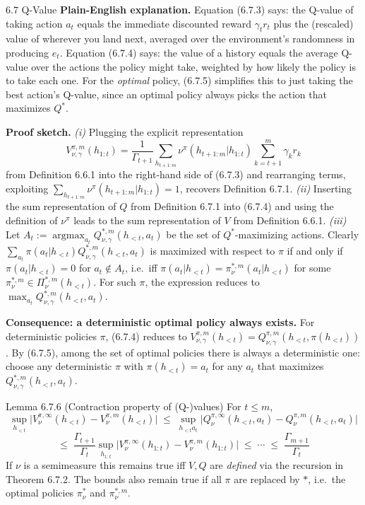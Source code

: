\documentclass[aspectratio=169,10pt]{beamer}
\begin{document}
\begin{frame}[allowframebreaks]{6.7 Q-Value}
\textbf{Plain-English explanation.} Equation (6.7.3) says: the Q-value of
taking action $a_t$ equals the immediate discounted reward $\gamma_t r_t$
plus the (rescaled) value of wherever you land next, averaged over the
environment's randomness in producing $e_t$. Equation (6.7.4) says: the
value of a history equals the average Q-value over the actions the policy
might take, weighted by how likely the policy is to take each one. For the
\emph{optimal} policy, (6.7.5) simplifies this to just taking the best
action's Q-value, since an optimal policy always picks the action that
maximizes $Q^{*}$.

\framebreak

\textbf{Proof sketch.} \emph{(i)} Plugging the explicit representation
\[
  V^{\pi,m}_{\nu,\gamma}(h_{1:t}) = \frac{1}{\Gamma_{t+1}}\sum_{h_{t+1:m}}\nu^\pi(h_{t+1:m}|h_{1:t})\sum_{k=t+1}^m\gamma_k r_k
\]
from Definition 6.6.1 into the right-hand side of (6.7.3) and rearranging
terms, exploiting $\sum_{h_{t+1:m}}\nu^\pi(h_{t+1:m}|h_{1:t})=1$, recovers
Definition 6.7.1. \emph{(ii)} Inserting the sum representation of $Q$ from
Definition 6.7.1 into (6.7.4) and using the definition of $\nu^\pi$ leads to
the sum representation of $V$ from Definition 6.6.1. \emph{(iii)} Let
$A_t := \operatorname{argmax}_{a_t}Q^{*,m}_{\nu,\gamma}(h_{<t},a_t)$ be the
set of $Q^{*}$-maximizing actions. Clearly
$\sum_{a_t}\pi(a_t|h_{<t})Q^{*,m}_{\nu,\gamma}(h_{<t},a_t)$ is maximized
with respect to $\pi$ if and only if $\pi(a_t|h_{<t})=0$ for $a_t \notin
A_t$, i.e.\ iff $\pi(a_t|h_{<t}) = \pi^{*,m}_\nu(a_t|h_{<t})$ for some
$\pi^{*,m}_\nu \in \Pi^{*,m}_\nu(h_{<t})$. For such $\pi$, the expression
reduces to $\max_{a_t}Q^{*,m}_{\nu,\gamma}(h_{<t},a_t)$.

\vspace{0.15cm}
\textbf{Consequence: a deterministic optimal policy always exists.} For
deterministic policies $\pi$, (6.7.4) reduces to
$V^{\pi,m}_{\nu,\gamma}(h_{<t}) = Q^{\pi,m}_{\nu,\gamma}(h_{<t},\pi(h_{<t}))$.
By (6.7.5), among the set of optimal policies there is always a
deterministic one: choose any deterministic $\pi$ with $\pi(h_{<t})=a_t$
for any $a_t$ that maximizes $Q^{*,m}_{\nu,\gamma}(h_{<t},a_t)$.

\framebreak

\begin{block}{Lemma 6.7.6 (Contraction property of (Q-)values)}
For $t \le m$,
\[
  \sup_{h_{<t}}\big|V^{\pi,\infty}_\nu(h_{<t}) - V^{\pi,m}_\nu(h_{<t})\big|
  \;\le\; \sup_{h_{<t}a_t}\big|Q^{\pi,\infty}_\nu(h_{<t},a_t) - Q^{\pi,m}_\nu(h_{<t},a_t)\big|
\]
\[
  \le\; \frac{\Gamma_{t+1}}{\Gamma_t}\sup_{h_{1:t}}\big|V^{\pi,\infty}_\nu(h_{1:t})-V^{\pi,m}_\nu(h_{1:t})\big|
  \;\le\; \cdots \;\le\; \frac{\Gamma_{m+1}}{\Gamma_t}
\]
If $\nu$ is a semimeasure this remains true iff $V,Q$ are \emph{defined}
via the recursion in Theorem 6.7.2. The bounds also remain true if all
$\pi$ are replaced by $*$, i.e.\ the optimal policies $\pi^{*}_\nu$ and
$\pi^{*,m}_\nu$.
\end{block}


\end{frame}
\end{document}
